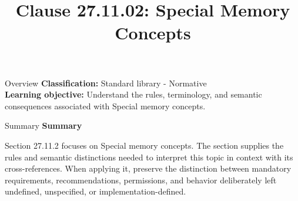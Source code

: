 \documentclass[10pt,letterpaper]{article}
\title{Clause 27.11.02: Special Memory Concepts}
\author{}
\date{}
\begin{document}
\maketitle
\begin{CornellOverviewBox}{Overview}
\textbf{Classification:} Standard library - Normative\\[2pt]
\textbf{Learning objective:} Understand the rules, terminology, and semantic consequences associated with Special memory concepts.
\end{CornellOverviewBox}\begin{CornellSummaryBox}{Summary}
{\sffamily\bfseries\color{Accent} Summary}\par\vspace{3pt}Section 27.11.2 focuses on Special memory concepts. The section supplies the rules and semantic distinctions needed to interpret this topic in context with its cross-references. When applying it, preserve the distinction between mandatory requirements, recommendations, permissions, and behavior deliberately left undefined, unspecified, or implementation-defined.
\end{CornellSummaryBox}
\end{document}
